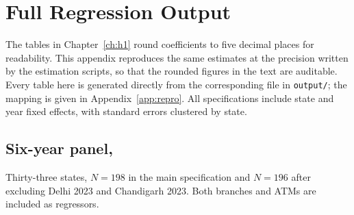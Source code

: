 \chapter{Full Regression Output}
\label{app:tables}

The tables in Chapter~\ref{ch:h1} round coefficients to five decimal places for readability.
This appendix reproduces the same estimates at the precision written by the estimation
scripts, so that the rounded figures in the text are auditable. Every table here is generated
directly from the corresponding file in \texttt{output/}; the mapping is given in
Appendix~\ref{app:repro}. All specifications include state and year fixed effects, with
standard errors clustered by state.

\section{Six-year panel, \panelA{}}
\label{sec:app-6yr}

Thirty-three states, $N = 198$ in the main specification and $N = 196$ after excluding
Delhi 2023 and Chandigarh 2023. Both branches and ATMs are included as regressors.

